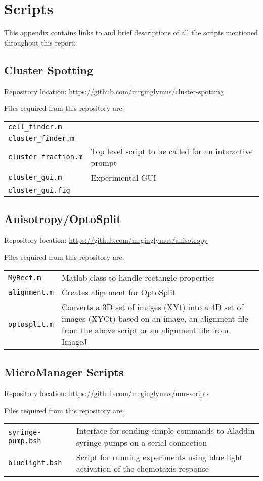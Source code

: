 \documentclass[../main.tex]{subfiles}
\begin{document}
\section{Scripts}

This appendix contains links to and brief descriptions of all the scripts mentioned throughout this report:

\subsection{Cluster Spotting}
Repository location: \url{https://github.com/mrginglymus/cluster-spotting}

Files required from this repository are:


\begin{tabular}{ll}
\texttt{cell\_finder.m}	&	\\
\texttt{cluster\_finder.m}	&	\\
\texttt{cluster\_fraction.m}	&	Top level script to be called for an interactive prompt	\\
\texttt{cluster\_gui.m}		&	Experimental GUI \\
\texttt{cluster\_gui.fig}	&	
\end{tabular}

\subsection{Anisotropy/OptoSplit}
Repository location: \url{https://github.com/mrginglymus/anisotropy}

Files required from this repository are:


\begin{tabular}{lp{12cm}}
\texttt{MyRect.m}	&	Matlab class to handle rectangle properties \\
\texttt{alignment.m}	&	Creates alignment for OptoSplit \\
\texttt{optosplit.m}	&	Converts a 3D set of images (XYt) into a 4D set of images (XYCt) based on an image, an alignment file from the above script or an alignment file from ImageJ
\end{tabular}

\subsection{MicroManager Scripts}

Repository location: \url{https://github.com/mrginglymus/mm-scripts}

Files required from this repository are:


\begin{tabular}{lp{12cm}}
\texttt{syringe-pump.bsh}	&	Interface for sending simple commands to Aladdin syringe pumps on a serial connection \\
\texttt{bluelight.bsh}	&	Script for running experiments using blue light activation of the chemotaxis response
\end{tabular}
\end{document}
